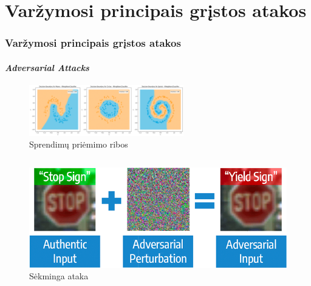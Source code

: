 \documentclass[12pt]{beamer}
\begin{document}
\section{Varžymosi principais grįstos atakos}
\begin{frame}
    \frametitle{Varžymosi principais grįstos atakos}
    \framesubtitle{\textit{Adversarial Attacks}}
    \begin{figure}
        \begin{small}
            \begin{center}
                \includegraphics[width=0.60\textwidth]{resources/decision_boundaries.png}
            \end{center}
            \caption{Sprendimų priėmimo ribos \cite{VisualisingDecisionBoundaries}}
            \label{fig:decision_boundaries}
        \end{small}
    \end{figure}\pause

    \vspace{-10pt}

    \begin{columns}[b]
        \begin{figure}
            \begin{small}
                \begin{center}
                    \includegraphics[width=\textwidth]{resources/adversarial_example.png}
                \end{center}
                \caption{Sėkminga ataka \cite{AdversarialImagesAttacks}}
                \label{fig:adversarial_example}
            \end{small}
        \end{figure} \pause


\end{columns}
\end{frame}
\end{document}
